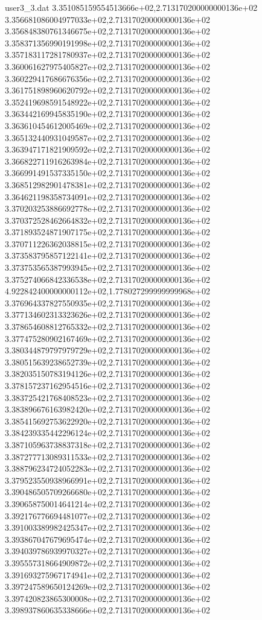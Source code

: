 \begin{filecontents}{user3_3.dat}
3.351085159554513666e+02,2.713170200000000136e+02
3.356681086004977033e+02,2.713170200000000136e+02
3.356848380761346675e+02,2.713170200000000136e+02
3.358371356990191998e+02,2.713170200000000136e+02
3.357183117281780937e+02,2.713170200000000136e+02
3.360061627975405827e+02,2.713170200000000136e+02
3.360229417686676356e+02,2.713170200000000136e+02
3.361751898960620792e+02,2.713170200000000136e+02
3.352419698591548922e+02,2.713170200000000136e+02
3.363442169945835190e+02,2.713170200000000136e+02
3.363610454612005469e+02,2.713170200000000136e+02
3.365132440931049587e+02,2.713170200000000136e+02
3.363947171821909592e+02,2.713170200000000136e+02
3.366822711916263984e+02,2.713170200000000136e+02
3.366991491537335150e+02,2.713170200000000136e+02
3.368512982901478381e+02,2.713170200000000136e+02
3.364621198358734091e+02,2.713170200000000136e+02
3.370203253886692778e+02,2.713170200000000136e+02
3.370372528462664832e+02,2.713170200000000136e+02
3.371893524871907175e+02,2.713170200000000136e+02
3.370711226362038815e+02,2.713170200000000136e+02
3.373583795857122141e+02,2.713170200000000136e+02
3.373753565387993945e+02,2.713170200000000136e+02
3.375274066842336538e+02,2.713170200000000136e+02
4.922842400000000112e+02,1.778027299999999968e+02
3.376964337827550935e+02,2.713170200000000136e+02
3.377134602313323626e+02,2.713170200000000136e+02
3.378654608812765332e+02,2.713170200000000136e+02
3.377475280902167469e+02,2.713170200000000136e+02
3.380344879797979729e+02,2.713170200000000136e+02
3.380515639238652739e+02,2.713170200000000136e+02
3.382035150783194126e+02,2.713170200000000136e+02
3.378157237162954516e+02,2.713170200000000136e+02
3.383725421768408523e+02,2.713170200000000136e+02
3.383896676163982420e+02,2.713170200000000136e+02
3.385415692753622920e+02,2.713170200000000136e+02
3.384239335442296124e+02,2.713170200000000136e+02
3.387105963738837318e+02,2.713170200000000136e+02
3.387277713089311533e+02,2.713170200000000136e+02
3.388796234724052283e+02,2.713170200000000136e+02
3.379523550938966991e+02,2.713170200000000136e+02
3.390486505709266680e+02,2.713170200000000136e+02
3.390658750014641214e+02,2.713170200000000136e+02
3.392176776694481077e+02,2.713170200000000136e+02
3.391003389982425347e+02,2.713170200000000136e+02
3.393867047679695474e+02,2.713170200000000136e+02
3.394039786939970327e+02,2.713170200000000136e+02
3.395557318664909872e+02,2.713170200000000136e+02
3.391693275967174941e+02,2.713170200000000136e+02
3.397247589650124269e+02,2.713170200000000136e+02
3.397420823865300008e+02,2.713170200000000136e+02
3.398937860635338666e+02,2.713170200000000136e+02

\end{filecontents}
